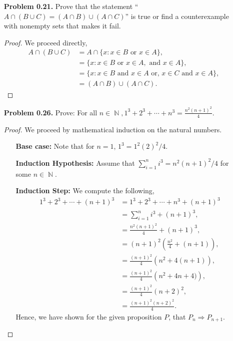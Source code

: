 \documentclass{amsart}
\DeclareMathOperator{\N}{\mathbb{N}}
\begin{document}
\begin{enumerate}
		\item[\textbf{Problem 0.21.}] Prove that the statement ``$A\cap (B \cup C) = (A\cap B)\cup(A \cap C)$'' is true or find a counterexample with nonempty sets that makes it fail.
		\begin{proof} We proceed directly,
			\begin{align*}
				A\cap(B \cup C) &= A \cap \{x : x \in B \text{ or }x \in A \}, \\
				&= \{ x : x \in B \text{ or }x \in A, \text{ and } x \in A \}, \\
				&= \{ x : x \in B \text{ and } x\in A \text{ or, }x \in C \text{ and } x \in A \}, \\
				&= (A \cap B) \cup (A\cap C).
			\end{align*}
		\end{proof}
		\newpage

		\item[\textbf{Problem 0.26.}] Prove: For all $n \in \N, 1^{3} + 2^{3} + \cdots + n^{3} = \frac{n^{2}(n + 1)^{2}}{4}$.
		\begin{proof} We proceed by mathematical induction on the natural numbers.
			\begin{enumerate}
				\item[\textbf{Base case:}] Note that for $n=1$, $1^{3}= 1^{2}(2)^{2}/4$.
				\item[\textbf{Induction Hypothesis:}] Assume that $\sum_{i=1}^{n} i^{3} = n^{2}(n+1)^{2}/4$ for some $n \in \N$.
				\item[\textbf{Induction Step:}] We compute the following,
					\begin{align*}
						1^{3} + 2^{3} + \cdots + (n+1)^{3} &= 1^{3} + 2^{3} + \cdots + n^{3} + (n+1)^{3} \\
						&= \sum_{i=1}^{n} i^{3} + (n+1)^{3}, \\
						&= \frac{n^{2}(n+1)^{2}}{4} + (n+1)^{3}, \\
						&= (n+1)^{2} \left( \frac{n^{2}}{4} + (n+1) \right), \\
						&= \frac{(n+1)^{2}}{4} \left( n^{2} + 4(n+1) \right), \\
						&= \frac{(n+1)^{2}}{4} \left( n^{2} + 4n + 4) \right), \\
						&= \frac{(n+1)^{2}}{4} (n+2)^{2}, \\
						&= \frac{(n+1)^{2}(n+2)^{2}}{4}.
					\end{align*}
					Hence, we have shown for the given proposition $P$, that $P_{n} \Rightarrow P_{n+1}$.
			\end{enumerate}
		\end{proof}


\end{enumerate}
\end{document}
